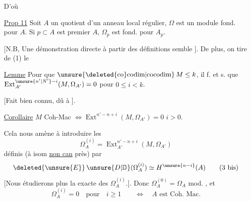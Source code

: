 \begingroup
\makeatletter\tagsleft@true\makeatother
D'où

\uline{Prop 11} Soit $A$ un quotient d'un anneau
local régulier,  $\Omega$ est un module fond.
pour $A$. Si $p\subset A$ est premier  $A$,
$\Omega_p$ est fond. pour $A_p$.

[N.B, Une démonstration directe à partir
des définitions semble ]. De plus,
on tire de (1) le

\uline{Lemme} Pour que $\operatorname{\unsure{\deleted{co}codim|cocodim}}M\leq k$, il f. et
s. que $\operatorname{Ext}_{A'}^{\unsure{n'|N'}-i}(M,\Omega_{A'})=0$ pour $0\leq i<k$.

[Fait bien connu, dû à ]. \deleted{\unsure{\S}}

\uline{Corollaire} $M$ Coh-Mac $\Longleftrightarrow\operatorname{Ext}^{n'-n+i}(M,\Omega_{A'})=0$
 $i>0$.

Cela nous amène à introduire les
\[
\Omega_A^{(i)}=\operatorname{Ext}_{A'}^{n'-n+i}(M,\Omega_{A'})\tag*{(3)}
\]
définis (à isom \uline{non can} près) par
\[
\deleted{\unsure{E}}\,\unsure{D|\mathbb D}(\Omega_A^{(i)})\simeq H^{\unsure{n-i}}(A)\tag*{(3 bis)}
\]
[Nous étudierons plus  la  exacte des $\Omega_A^{(i)}$.].
Donc $\Omega_A^{(0)}=\Omega_A$ mod. , et
\[
\Omega_A^{(i)}=0\quad\text{pour}\quad i\geq1\qquad\Longleftrightarrow\quad A\text{ est Coh. Mac.}
\]
\endgroup

